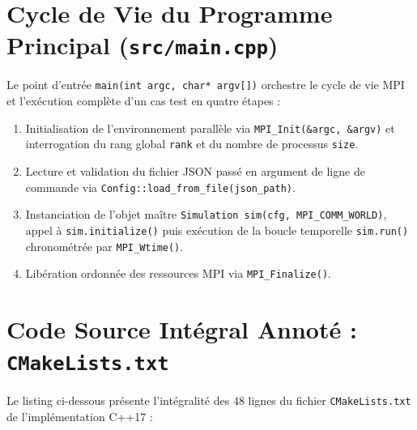 \documentclass[10pt,a4paper,oneside]{book}
\begin{document}
\section{Cycle de Vie du Programme Principal (\texttt{src/main.cpp})}
Le point d'entrée \texttt{main(int argc, char* argv[])} orchestre le cycle de vie MPI et l'exécution complète d'un cas test en quatre étapes :
\begin{enumerate}
  \item Initialisation de l'environnement parallèle via \texttt{MPI\_Init(\&argc, \&argv)} et interrogation du rang global \texttt{rank} et du nombre de processus \texttt{size}.
  \item Lecture et validation du fichier JSON passé en argument de ligne de commande via \texttt{Config::load\_from\_file(json\_path)}.
  \item Instanciation de l'objet maître \texttt{Simulation sim(cfg, MPI\_COMM\_WORLD)}, appel à \texttt{sim.initialize()} puis exécution de la boucle temporelle \texttt{sim.run()} chronométrée par \texttt{MPI\_Wtime()}.
  \item Libération ordonnée des ressources MPI via \texttt{MPI\_Finalize()}.
\end{enumerate}

\section{Code Source Intégral Annoté : \texttt{CMakeLists.txt}}
Le listing ci-dessous présente l'intégralité des 48 lignes du fichier \texttt{CMakeLists.txt} de l'implémentation C++17 :
\end{document}
